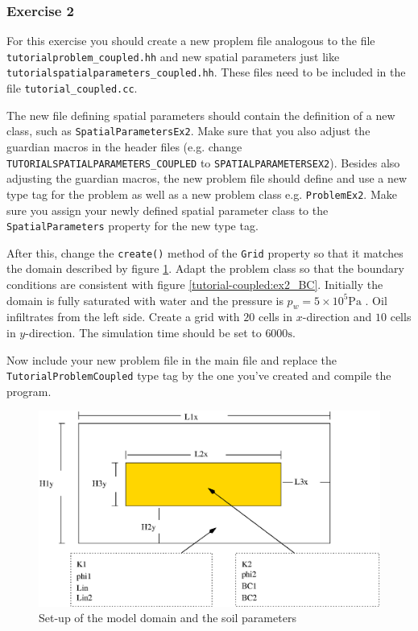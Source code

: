 \subsubsection{Exercise 2}
For this exercise you should create a new proplem file analogous to
the file \texttt{tutorialproblem\_coupled.hh} and new spatial parameters 
just like \texttt{tutorialspatialparameters\_coupled.hh}. These files need to
be included in the file \texttt{tutorial\_coupled.cc}. 

The new file defining spatial parameters should contain the definition 
of a new class, such as \texttt{SpatialParametersEx2}. Make sure that you also adjust the guardian
macros in the header files (e.g. change \texttt{TUTORIALSPATIALPARAMETERS\_COUPLED} to
\texttt{SPATIALPARAMETERSEX2}). Besides also adjusting the guardian macros, 
the new problem file should define and use a new type tag for the problem as well as a new problem class
e.g. \texttt{ProblemEx2}. Make sure you assign your newly defined spatial 
parameter class to the \texttt{SpatialParameters} property for the new 
type tag. 

After this, change the \texttt{create()} method of the \texttt{Grid}
property so that it matches the domain described
by figure \ref{tutorial-coupled:ex2_Domain}. Adapt the problem class
so that the boundary conditions are consistent with figure
\ref{tutorial-coupled:ex2_BC}. Initially the domain is fully saturated
with water and the pressure is $p_w = 5 \times 10^5 \text{Pa}$ . Oil
infiltrates from the left side. Create a grid with $20$ cells in
$x$-direction and $10$ cells in $y$-direction. The simulation time
should be set to $6000 \text{s}$.

Now include your new problem file in the main file and replace the
\texttt{TutorialProblemCoupled} type tag by the one you've created and
compile the program.


\begin{figure}[h]
\centering
\includegraphics[width=0.8\linewidth,keepaspectratio]{EPS/Ex2_Domain.eps}
\caption{Set-up of the model domain and the soil parameters}\label{tutorial-coupled:ex2_Domain}
\end{figure}


